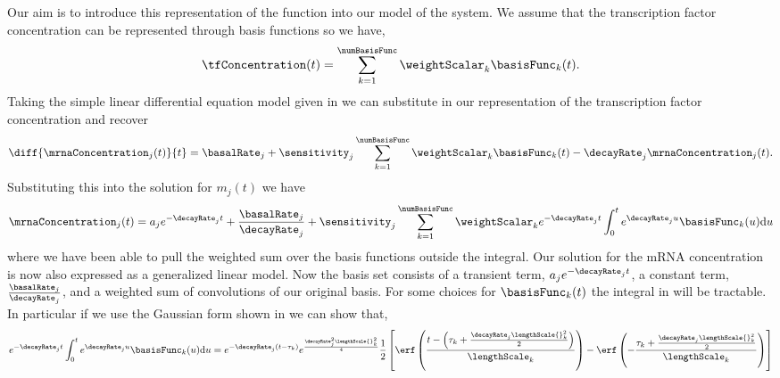 \documentclass{article}
\begin{document}
Our aim is to introduce this representation of the function into our
model of the system. We assume that the transcription factor
concentration can be represented through basis functions so we have,
\[
\tfConcentration(t) = \sum_{k=1}^\numBasisFunc \weightScalar_k\basisFunc_k(t).
\]
Taking the simple linear differential equation model given in
 we can substitute in our
representation of the transcription factor concentration and recover
\[
\diff{\mrnaConcentration_j(t)}{t} = \basalRate_j + \sensitivity_j \sum_{k=1}^\numBasisFunc \weightScalar_k \basisFunc_k(t) -\decayRate_j \mrnaConcentration_j(t). 
\]
Substituting this into the solution for $m_j(t)$ we have
\begin{equation}
\mrnaConcentration_j(t) = a_je^{-\decayRate_{j}t} + \frac{\basalRate_j}{\decayRate_j} + \sensitivity_j\sum_{k=1}^\numBasisFunc \weightScalar_k e^{-\decayRate_{j}t}\int_0^t e^{\decayRate_{j}u} \basisFunc_k(u) \mathrm{d}u \label{eq:basisFunctionSolution}
\end{equation}
where we have been able to pull the weighted sum over the basis
functions outside the integral. Our solution for the mRNA
concentration is now also expressed as a generalized linear model. Now
the basis set consists of a transient term, $a_je^{-\decayRate_jt}$, a
constant term, $\frac{\basalRate_j}{\decayRate_j}$, and a weighted sum
of convolutions of our original basis. For some choices for
$\basisFunc_k(t)$ the integral in 
will be tractable. In particular if we use the Gaussian form shown in
 we can show that,
 \[
 e^{-\decayRate_{j}t}\int_0^t e^{\decayRate_{j}u} \basisFunc_k(u) \mathrm{d}u = e^{-\decayRate_j(t-\tau_k)}e^{\frac{\decayRate_j^2\lengthScale{}_k^2}{4}}
\frac{1}{2}\left[\erf\left(\frac{t-\left(\tau_k+\frac{\decayRate_j\lengthScale{}_k^2}{2}\right)}{\lengthScale_k}\right)-\erf\left(-\frac{\tau_k+\frac{\decayRate_j\lengthScale{}_k^2}{2}}{\lengthScale_k}\right)\right]
\]
\end{document}

